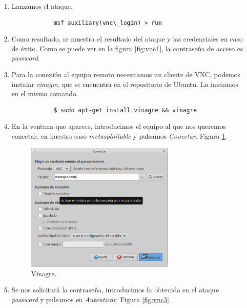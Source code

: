 \documentclass[a4,12pt,onecolum]{article}
\begin{document}
\begin{enumerate}
	\item Lanzamos el ataque.
		\begin{verbatim}
			msf auxiliary(vnc\_login) > run
		\end{verbatim}

	\item Como resultado, se muestra el resultado del ataque y las credenciales en caso de éxito. Como se puede ver en la figura \ref{fig:vnc1}, la contraseña de acceso es \emph{password}.

	\item Para la conexión al equipo remoto necesitamos un cliente de VNC, podemos instalar \emph{vinagre}, que se encuentra en el repositorio de Ubuntu. Lo iniciamos en el mismo comando.
		\begin{verbatim}
			$ sudo apt-get install vinagre && vinagre
		\end{verbatim}

	\item En la ventana que aparece, introducimos el equipo al que nos queremos conectar, en nuestro caso \emph{metasploitable} y pulsamos \emph{Conectar}. Figura \ref{fig:vnc2}.

\begin{figure}[htbp]
\centering
\includegraphics[width=0.7\textwidth]{./images/vnc/equipo_acceso.png}
\caption{Vinagre.}
\label{fig:vnc2}
\end{figure}

	\item Se nos solicitará la contraseña, introducimos la obtenida en el ataque \emph{password} y pulsamos en \emph{Autenticar}. Figura \ref{fig:vnc3}.


\end{enumerate}
\end{document}
